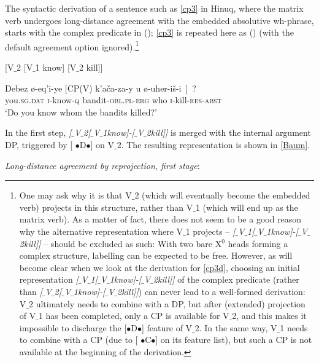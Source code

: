 \documentclass[output=paper
,modfonts
,nonflat]{langsci/langscibook}
\begin{document}
The syntactic derivation of a sentence such as \ref{cp3} in Hinuq,
where the matrix verb undergoes long-distance agreement with the
embedded absolutive wh-phrase, starts with the complex predicate in
(\Next); \ref{cp3} is repeated here as (\NNext) (with the default
agreement option ignored).\footnote{\label{vari2}One may ask why it is
  that V$\_$2 (which will eventually become the embedded verb) projects
  in this structure, rather than V$\_$1 (which will end up as the matrix
  verb).  As a matter of fact, there does not seem to be a good reason
  why the alternative representation where V$\_$1 projects -- {\it
    [$\_${V$\_$1}[$\_${V$\_$1}know]-[$\_${V$\_$2}kill]]} -- should be excluded as such:
  With two bare X$^0$ heads forming a complex structure, labelling can
  be expected to be free. However, as will become clear when we look
  at the derivation for \ref{cp3d}, choosing an initial representation
  {\itshape [$\_${V$\_$1}[$\_${V$\_$1}know]-[$\_${V$\_$2}kill]]} of the complex predicate
  (rather than {\itshape [$\_${V$\_$2}[$\_${V$\_$1}know]-[$\_${V$\_$2}kill]]}) can never lead
  to a well-formed derivation: V$\_$2 ultimately needs to combine with a
  DP, but after (extended) projection of V$\_$1 has been completed, only
  a CP is available for V$\_$2, and this makes it impossible to discharge
  the [{\small $\bullet$}D{\small $\bullet$}] feature of V$\_$2. In the
  same way, V$\_$1 needs to combine with a CP (due to [{\small
      $\bullet$}C{\small $\bullet$}] on its feature list), but such a
  CP is not available at the beginning of the derivation.}

\ea\relax\label{ex:mueller:30} [V$\_$2 [V$\_$1 know] [V$\_$2 kill]]\z

 \ea\label{ex:mueller:31}  \label{cp3d}
 \gll  Debez \o -eq'i-ye [CP(V) k'a\v{c}a\textgamma -za-y \textbeltl u \o -uher-i\v{s}-\textbeltl i~]~? \\
  you.{\scshape sg.dat} {\scshape i}-know-{\scshape q} {} bandit-{\scshape obl.pl-erg}   who {\scshape i}-kill-{\scshape res-abst} \\ 
 \glt `Do you know whom the bandits killed?'
\z

In the first step, {\itshape [$\_${V$\_$2}[$\_${V$\_$1}know]-[$\_${V$\_$2}kill]]} is merged
with  the internal argument DP, triggered by  [{\small
    $\bullet$}D{\small $\bullet$}] on V$\_$2. The resulting
representation is shown in \ref{Baum}.

\ea\label{ex:mueller:32} {\itshape Long-distance agreement \label{Baum}by reprojection, first stage}:
\z
\end{document}
